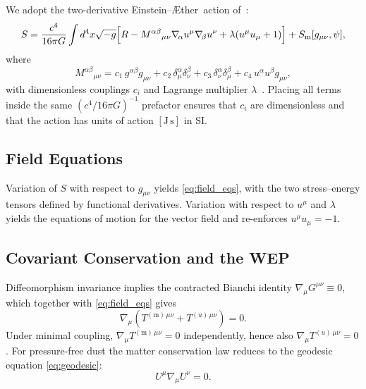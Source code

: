 \documentclass[12pt,a4paper]{article}
\newcommand{\Aether}{\AE ther}
\newcommand{\Sm}{S_{\mathrm{m}}}
\begin{document}
We adopt the two-derivative Einstein--\Aether\ action
of~\citet{jacobson2001,jacobson2008}:
\begin{equation}
  S=\frac{c^{4}}{16\pi G}\int d^{4}x\sqrt{-g}
    \Bigl[R
    -M^{\alpha\beta}{}_{\mu\nu}
     \nabla_{\!\alpha}u^{\mu}\nabla_{\!\beta}u^{\nu}
    +\lambda(u^{\mu}u_{\mu}+1)\Bigr]
  +\Sm[g_{\mu\nu},\psi],
  \label{eq:S}
\end{equation}
where
\begin{equation}
  M^{\alpha\beta}{}_{\mu\nu}
  = c_{1}\,g^{\alpha\beta}g_{\mu\nu}
  + c_{2}\,\delta^{\alpha}_{\mu}\delta^{\beta}_{\nu}
  + c_{3}\,\delta^{\alpha}_{\nu}\delta^{\beta}_{\mu}
  + c_{4}\,u^{\alpha}u^{\beta}g_{\mu\nu},
  \label{eq:Mtensor}
\end{equation}
with dimensionless couplings $c_{i}$ and Lagrange multiplier
$\lambda$~\citep{jacobson2001}. Placing all terms inside the same
$(c^{4}/16\pi G)^{-1}$ prefactor ensures that $c_{i}$ are dimensionless
and that the action has units of action $[\mathrm{J\,s}]$ in SI.

\subsection{Field Equations}

Variation of $S$ with respect to $g_{\mu\nu}$ yields \cref{eq:field_eqs},
with the two stress--energy tensors defined by functional derivatives.
Variation with respect to $u^{\mu}$ and $\lambda$ yields the equations of
motion for the vector field and re-enforces $u^{\mu}u_{\mu}=-1$.

\subsection{Covariant Conservation and the WEP}

Diffeomorphism invariance implies the contracted Bianchi identity
$\nabla_{\!\mu}G^{\mu\nu}\equiv 0$, which together with \cref{eq:field_eqs}
gives
\begin{equation}
  \nabla_{\!\mu}\!\left(T^{(\mathrm{m})\,\mu\nu}+T^{(u)\,\mu\nu}\right)=0.
\end{equation}
Under minimal coupling, $\nabla_{\!\mu}T^{(\mathrm{m})\,\mu\nu}=0$
independently, hence also $\nabla_{\!\mu}T^{(u)\,\mu\nu}=0$. For
pressure-free dust the matter conservation law reduces to the geodesic
equation \eqref{eq:geodesic}:
\begin{equation}
  U^{\mu}\nabla_{\!\mu}U^{\nu}=0.
  \label{eq:geodesic}
\end{equation}
\end{document}
